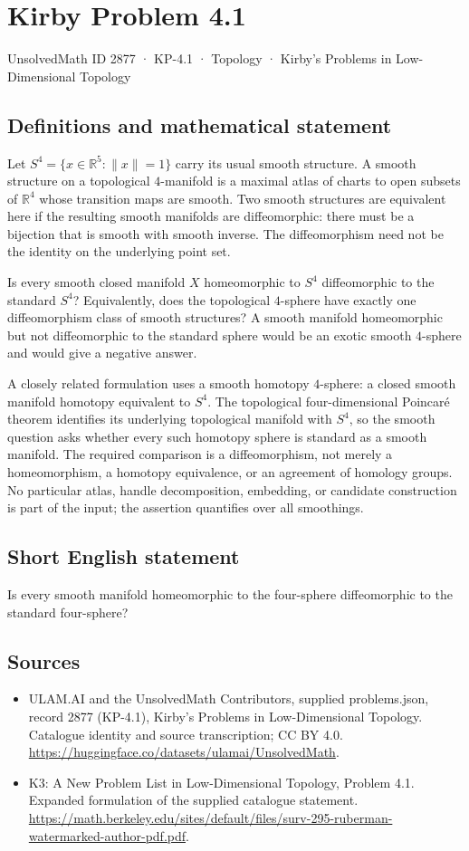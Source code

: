 \documentclass[11pt,a4paper]{article}
\begin{document}
\section*{Kirby Problem 4.1}\label{2877}
{\small UnsolvedMath ID 2877 · KP-4.1 · Topology · Kirby's Problems in Low-Dimensional Topology}
\subsection{Definitions and mathematical statement}
Let $S^4=\{x\in\mathbb R^5:\|x\|=1\}$ carry its usual smooth structure.
A smooth structure on a topological $4$-manifold is a maximal atlas
of charts to open subsets of $\mathbb R^4$ whose transition maps are
smooth. Two smooth structures are equivalent here if the resulting
smooth manifolds are diffeomorphic: there must be a bijection that is
smooth with smooth inverse. The diffeomorphism need not be the identity
on the underlying point set.

Is every smooth closed manifold $X$ homeomorphic to $S^4$ diffeomorphic
to the standard $S^4$? Equivalently, does the topological $4$-sphere
have exactly one diffeomorphism class of smooth structures?
A smooth manifold homeomorphic but not diffeomorphic to the standard
sphere would be an exotic smooth $4$-sphere and would give a negative
answer.

A closely related formulation uses a smooth homotopy $4$-sphere: a
closed smooth manifold homotopy equivalent to $S^4$. The topological
four-dimensional Poincar\'e theorem identifies its underlying topological
manifold with $S^4$, so the smooth question asks whether every such
homotopy sphere is standard as a smooth manifold.
The required comparison is a diffeomorphism, not merely a homeomorphism,
a homotopy equivalence, or an agreement of homology groups. No particular
atlas, handle decomposition, embedding, or candidate construction is
part of the input; the assertion quantifies over all smoothings.
\subsection{Short English statement}
Is every smooth manifold homeomorphic to the four-sphere diffeomorphic to the standard four-sphere?
\subsection{Sources}
\begin{itemize}
\item[S1] ULAM.AI and the UnsolvedMath Contributors, supplied problems.json, record 2877 (KP-4.1), Kirby's Problems in Low-Dimensional Topology. Catalogue identity and source transcription; CC BY 4.0.
\url{https://huggingface.co/datasets/ulamai/UnsolvedMath}.
\item[S2] K3: A New Problem List in Low-Dimensional Topology, Problem 4.1. Expanded formulation of the supplied catalogue statement.
\url{https://math.berkeley.edu/sites/default/files/surv-295-ruberman-watermarked-author-pdf.pdf}.
\end{itemize}
\end{document}
